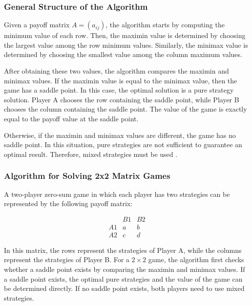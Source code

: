 \documentclass[12pt,a4paper]{article}
\begin{document}
\subsubsection{General Structure of the Algorithm}

Given a payoff matrix \(A = (a_{ij})\), the algorithm starts by computing the minimum value of each row. Then, the maximin value is determined by choosing the largest value among the row minimum values. Similarly, the minimax value is determined by choosing the smallest value among the column maximum values.

After obtaining these two values, the algorithm compares the maximin and minimax values. If the maximin value is equal to the minimax value, then the game has a saddle point. In this case, the optimal solution is a pure strategy solution. Player A chooses the row containing the saddle point, while Player B chooses the column containing the saddle point. The value of the game is exactly equal to the payoff value at the saddle point.

Otherwise, if the maximin and minimax values are different, the game has no saddle point. In this situation, pure strategies are not sufficient to guarantee an optimal result. Therefore, mixed strategies must be used \cite{murthy2007}. 

\subsubsection{Algorithm for Solving 2x2 Matrix Games}

A two-player zero-sum game in which each player has two strategies can be represented by the following payoff matrix:

\begingroup
\small
\renewcommand{\arraystretch}{0.75}
\setlength{\arraycolsep}{4pt}
\[
\begin{array}{c|cc}
 & B1 & B2\\
\hline
A1 & a & b \\
A2 & c & d
\end{array}
\]
\endgroup

In this matrix, the rows represent the strategies of Player A, while the columns represent the strategies of Player B. For a \(2 \times 2\) game, the algorithm first checks whether a saddle point exists by comparing the maximin and minimax values. If a saddle point exists, the optimal pure strategies and the value of the game can be determined directly. If no saddle point exists, both players need to use mixed strategies.
\end{document}

